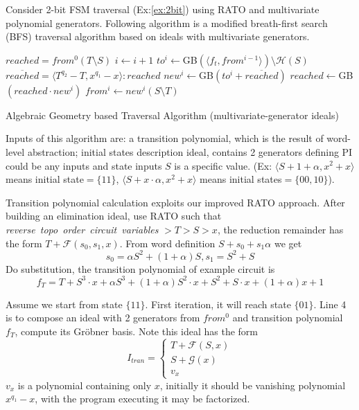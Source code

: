 \begin{Example}
Consider 2-bit FSM traversal (Ex:\ref{ex:2bit}) using RATO and multivariate polynomial generators.
Following algorithm is a modified breath-first search (BFS) traversal algorithm based on ideals with multivariate 
generators.
\begin{algorithm}[hbt]
\SetAlgoNoLine

  $reached = from^0(T\setminus S)$\;
  {
  	$i \gets i + 1$\;
	$to^i \gets$GB$(\langle f_t, from^{i-1}\rangle) \setminus \mathcal H(S)$\;
	$\overline{reached} = \langle T^{q_2}-T, x^{q_1} - x \rangle : reached$\;
	$new^i \gets $GB$(to^i + \overline{reached})$\;
  	$reached \gets $GB$( reached \cdot new^i)$\;
	$from^i \gets new^i(S\setminus T)$\;
  }
\caption {Algebraic Geometry based Traversal Algorithm (multivariate-generator ideals)}\label{alg:multi}
\end{algorithm}

Inputs of this algorithm are: a transition polynomial, which is the result of word-level abstraction; initial 
states description ideal, contains 2 generators defining PI could be any inputs and state inputs $S$ is a specific
value. (Ex: $\langle S+1+\alpha, x^2+x\rangle$ means initial state$=\{11\}$,
$\langle S+x\cdot\alpha, x^2+x\rangle$ means initial states$=\{00,10\}$).

Transition polynomial calculation exploits our improved RATO approach. After building
an elimination ideal, use RATO such that \emph{reverse\ topo\ order\ circuit\ variables }$> T > S > x$, the reduction
remainder has the form $T+\mathcal F(s_0,s_1,x)$. From word definition $S+s_0+s_1\alpha$ we get
$$s_0 = \alpha S^2+ (1+\alpha)S, s_1 = S^2+S$$
Do substitution, the transition polynomial of example circuit is 
$$f_T = T+S^3\cdot x+\alpha S^3+(1+\alpha)S^2\cdot x+S^2+S\cdot x+(1+\alpha)x+1$$

Assume we start from state $\{11\}$. First iteration, it will reach state $\{01\}$. Line 4 is to compose an
ideal with 2 generators from $from^0$ and transition polynomial $f_T$, compute its Gr\"obner basis. Note this ideal
has the form
\begin{equation}
I_{tran} = \left\{
             \begin{array}{c}
             T+\mathcal F(S,x) \\
             S + \mathcal G(x) \\
             v_x
             \end{array}  
        \right.
\end {equation}
$v_x$ is a polynomial containing only $x$, initially it should be vanishing polynomial $x^{q_1}-x$, with the program executing
it may be factorized.


\end{Example}
